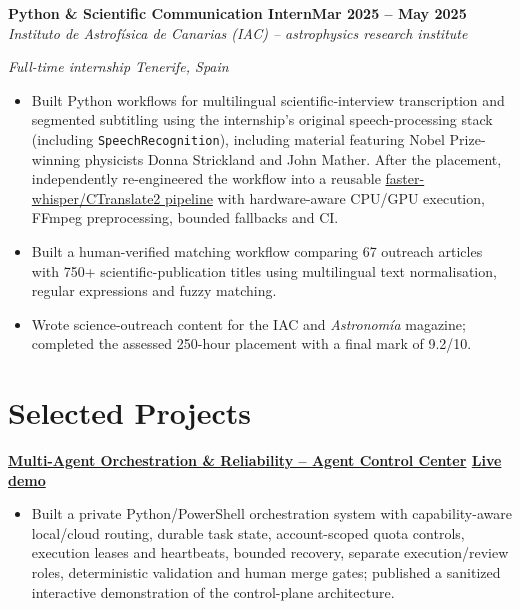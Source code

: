 \documentclass[10pt,a4paper]{article}
\newcommand{\project}[1]{%
  \needspace{3\baselineskip}%
  \textbf{#1}\par\nopagebreak
  \vspace{0.06em}
}
\begin{document}
\vspace{0.3cm}
%
\textbf{Python \& Scientific Communication Intern}\hfill\textbf{Mar 2025 -- May 2025}\\[-0.08em]
\textit{Instituto de Astrof\'isica de Canarias (IAC) -- astrophysics research institute}\par\nopagebreak
\textit{Full-time internship \textbar{} Tenerife, Spain}\par\nopagebreak
\vspace{0.10em}

\begin{itemize}
  \item Built Python workflows for multilingual scientific-interview transcription and segmented subtitling using the internship's original speech-processing stack (including \texttt{SpeechRecognition}), including material featuring Nobel Prize-winning physicists Donna Strickland and John Mather. After the placement, independently re-engineered the workflow into a reusable \href{https://github.com/albertoreyescastro/adaptive-whisper-transcription-pipeline}{faster-whisper/CTranslate2 pipeline} with hardware-aware CPU/GPU execution, FFmpeg preprocessing, bounded fallbacks and CI.
  \item Built a human-verified matching workflow comparing 67 outreach articles with 750+ scientific-publication titles using multilingual text normalisation, regular expressions and fuzzy matching.
  \item Wrote science-outreach content for the IAC and \textit{Astronom\'ia} magazine; completed the assessed 250-hour placement with a final mark of 9.2/10.
\end{itemize}

\section{Selected Projects}

\project{\href{https://github.com/albertoreyescastro/agent-control-center}{Multi-Agent Orchestration \& Reliability -- Agent Control Center}\textmd{ \textbar{} \href{https://albertoreyescastro.github.io/agent-control-center/}{Live demo}}}
\begin{itemize}
  \item Built a private Python/PowerShell orchestration system with capability-aware local/cloud routing, durable task state, account-scoped quota controls, execution leases and heartbeats, bounded recovery, separate execution/review roles, deterministic validation and human merge gates; published a sanitized interactive demonstration of the control-plane architecture.
\end{itemize}
\end{document}
